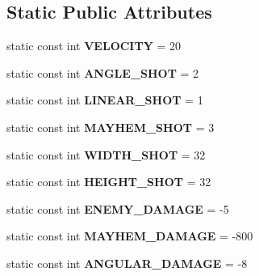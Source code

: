 \subsection*{Static Public Attributes}
\begin{DoxyCompactItemize}
\item 
\hypertarget{class_shot_af9fdec8f5ede1faa442fac378a81b072}{static const int {\bfseries V\-E\-L\-O\-C\-I\-T\-Y} = 20}\label{class_shot_af9fdec8f5ede1faa442fac378a81b072}

\item 
\hypertarget{class_shot_a26d13b7f383ca64bb6e775b8dbaba834}{static const int {\bfseries A\-N\-G\-L\-E\-\_\-\-S\-H\-O\-T} = 2}\label{class_shot_a26d13b7f383ca64bb6e775b8dbaba834}

\item 
\hypertarget{class_shot_a5b86e410ce75a9e9c5277e6a3a6ebbf7}{static const int {\bfseries L\-I\-N\-E\-A\-R\-\_\-\-S\-H\-O\-T} = 1}\label{class_shot_a5b86e410ce75a9e9c5277e6a3a6ebbf7}

\item 
\hypertarget{class_shot_aea2978e9d7f2212f66d33b44fa864e7c}{static const int {\bfseries M\-A\-Y\-H\-E\-M\-\_\-\-S\-H\-O\-T} = 3}\label{class_shot_aea2978e9d7f2212f66d33b44fa864e7c}

\item 
\hypertarget{class_shot_a8b4df95b379ba5fbecc41612c086f429}{static const int {\bfseries W\-I\-D\-T\-H\-\_\-\-S\-H\-O\-T} = 32}\label{class_shot_a8b4df95b379ba5fbecc41612c086f429}

\item 
\hypertarget{class_shot_a1f4c11429e906bd99576ed89dcc1c487}{static const int {\bfseries H\-E\-I\-G\-H\-T\-\_\-\-S\-H\-O\-T} = 32}\label{class_shot_a1f4c11429e906bd99576ed89dcc1c487}

\item 
\hypertarget{class_shot_a1f093fa878e873dd07133df7217c0298}{static const int {\bfseries E\-N\-E\-M\-Y\-\_\-\-D\-A\-M\-A\-G\-E} = -\/5}\label{class_shot_a1f093fa878e873dd07133df7217c0298}

\item 
\hypertarget{class_shot_a2c364fcd4dec0d1e0f4b2df259df80c5}{static const int {\bfseries M\-A\-Y\-H\-E\-M\-\_\-\-D\-A\-M\-A\-G\-E} = -\/800}\label{class_shot_a2c364fcd4dec0d1e0f4b2df259df80c5}

\item 
\hypertarget{class_shot_a795b718149dd6d1ab4162103bd0a31c9}{static const int {\bfseries A\-N\-G\-U\-L\-A\-R\-\_\-\-D\-A\-M\-A\-G\-E} = -\/8}\label{class_shot_a795b718149dd6d1ab4162103bd0a31c9}


\end{DoxyCompactItemize}
